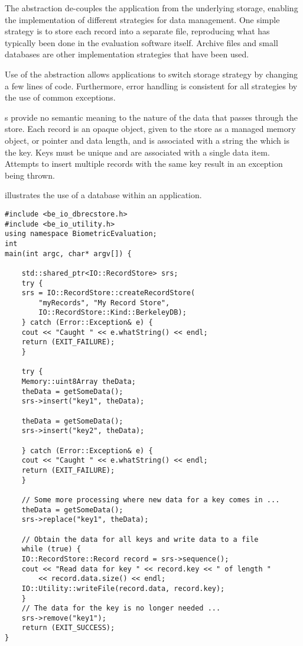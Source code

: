 The  abstraction de-couples the application from
the underlying storage, enabling the implementation of different strategies for
data management. One simple strategy is to store each record into a separate
file, reproducing what has typically been done in the evaluation software
itself. Archive files and small databases are other implementation strategies
that have been used.

Use of the  abstraction allows applications to switch
storage strategy by changing a few lines of code. Furthermore, error handling
is consistent for all strategies by the use of common exceptions.

s provide no semantic meaning to the nature of the data that passes
through the store. Each record is an opaque object, given to the store as a
managed memory object, or pointer and data length, and is associated with a
string the which is the key.  Keys must
be unique and are associated with a single data item. Attempts to insert
multiple records with the same key result in an exception being thrown.

 illustrates the use of a database
 within an application.

\begin{lstlisting}[caption={Using a \class{RecordStore}}, label=lst:recordstoreuse]
#include <be_io_dbrecstore.h>
#include <be_io_utility.h>
using namespace BiometricEvaluation;
int
main(int argc, char* argv[]) {

    std::shared_ptr<IO::RecordStore> srs;
    try {
	srs = IO::RecordStore::createRecordStore(
	    "myRecords", "My Record Store",
	    IO::RecordStore::Kind::BerkeleyDB);
    } catch (Error::Exception& e) {
	cout << "Caught " << e.whatString() << endl;
	return (EXIT_FAILURE);
    }

    try {
	Memory::uint8Array theData;
	theData = getSomeData();
	srs->insert("key1", theData);

	theData = getSomeData();
	srs->insert("key2", theData);

    } catch (Error::Exception& e) {
	cout << "Caught " << e.whatString() << endl;
	return (EXIT_FAILURE);
    }

    // Some more processing where new data for a key comes in ...
    theData = getSomeData();
    srs->replace("key1", theData);
  
    // Obtain the data for all keys and write data to a file
    while (true) {
	IO::RecordStore::Record record = srs->sequence();
	cout << "Read data for key " << record.key << " of length "
	    << record.data.size() << endl;
	IO::Utility::writeFile(record.data, record.key);
    }
    // The data for the key is no longer needed ...
    srs->remove("key1");
    return (EXIT_SUCCESS);
}
\end{lstlisting}

